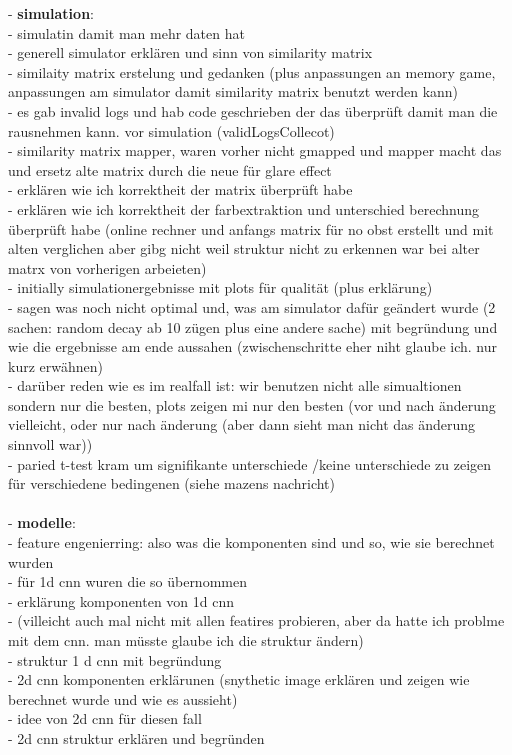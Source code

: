 - \textbf{simulation}:\\
- simulatin damit man mehr daten hat\\
- generell simulator erklären und sinn von similarity matrix\\
- similaity matrix erstelung und gedanken (plus anpassungen an memory game, anpassungen am simulator damit similarity matrix benutzt werden kann)\\
- es gab invalid logs und hab code geschrieben der das überprüft damit man die rausnehmen kann. vor simulation (validLogsCollecot)\\
- similarity matrix mapper, waren vorher nicht gmapped und mapper macht das und ersetz alte matrix durch die neue für glare effect\\
- erklären wie ich korrektheit der matrix überprüft habe\\
- erklären wie ich korrektheit der farbextraktion und unterschied berechnung überprüft habe (online rechner und anfangs matrix für no obst erstellt und mit alten verglichen aber gibg nicht weil struktur nicht zu erkennen war bei alter matrx von vorherigen arbeieten)\\
- initially simulationergebnisse mit plots für qualität (plus erklärung)\\
- sagen was noch nicht optimal und, was am simulator dafür geändert wurde (2 sachen: random decay ab 10 zügen plus eine andere sache) mit begründung und wie die ergebnisse am ende aussahen (zwischenschritte eher niht glaube ich. nur kurz erwähnen)\\
- darüber reden wie es im realfall ist: wir benutzen nicht alle simualtionen sondern nur die besten, plots zeigen mi nur den besten (vor und nach änderung vielleicht, oder nur nach änderung (aber dann sieht man nicht das änderung sinnvoll war))\\
- paried t-test kram um signifikante unterschiede /keine unterschiede zu zeigen für verschiedene bedingenen (siehe mazens nachricht)\\\\

- \textbf{modelle}:\\
- feature engenierring: also was die komponenten sind und so, wie sie berechnet wurden\\
- für 1d cnn wuren die so übernommen\\
- erklärung komponenten von 1d cnn \\
- (villeicht auch mal nicht mit allen featires probieren, aber da hatte ich problme mit dem cnn. man müsste glaube ich die struktur ändern)\\
- struktur 1 d cnn mit begründung\\ 
- 2d cnn komponenten erklärunen (snythetic image erklären und zeigen wie berechnet wurde und wie es aussieht)\\
- idee von 2d cnn für diesen fall\\
- 2d cnn struktur erklären und begründen\\\\

